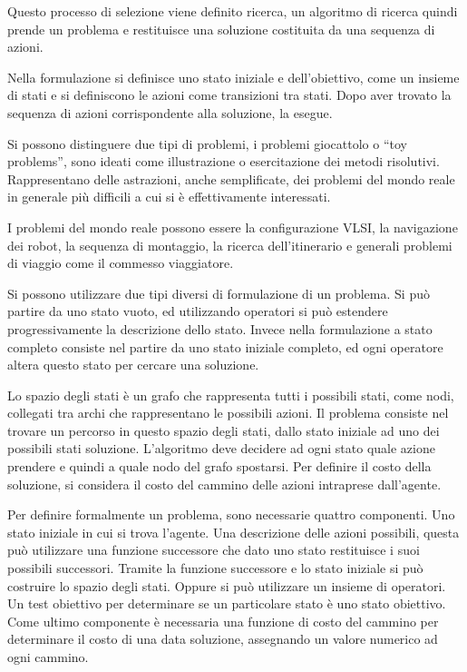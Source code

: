 \documentclass{article}
\numberwithin{equation}{subsection}
\begin{document}
Questo processo di selezione viene definito ricerca, un algoritmo di ricerca quindi  
prende un problema e restituisce una soluzione costituita da una sequenza di azioni. 

Nella formulazione si definisce uno stato iniziale e dell'obiettivo, come un insieme di stati 
e si definiscono le azioni come transizioni tra stati. Dopo aver trovato la sequenza di azioni 
corrispondente alla soluzione, la esegue. 


Si possono distinguere due tipi di problemi, i problemi giocattolo o ``toy problems'', sono 
ideati come illustrazione o esercitazione dei metodi risolutivi. Rappresentano delle 
astrazioni, anche semplificate, dei problemi del mondo reale in generale più difficili a cui 
si è effettivamente interessati. 

I problemi del mondo reale possono essere la configurazione VLSI, la navigazione dei robot, 
la sequenza di montaggio, la ricerca dell'itinerario e generali problemi di viaggio come il 
commesso viaggiatore. 



Si possono utilizzare due tipi diversi di formulazione di un problema. Si può partire da uno 
stato vuoto, ed utilizzando operatori si può estendere progressivamente la descrizione 
dello stato. 
Invece nella formulazione a stato completo consiste nel partire da uno stato iniziale completo, 
ed ogni operatore altera questo stato per cercare una soluzione. 


Lo spazio degli stati è un grafo che rappresenta tutti i possibili stati, come nodi, collegati 
tra archi che rappresentano le possibili azioni. Il problema consiste nel trovare un 
percorso in questo spazio degli stati, dallo stato iniziale ad uno dei possibili stati 
soluzione. L'algoritmo deve decidere ad ogni stato quale azione prendere e quindi a quale nodo 
del grafo spostarsi. 
Per definire il costo della soluzione, si considera il costo del cammino delle azioni 
intraprese dall'agente. 

Per definire formalmente un problema, sono necessarie quattro componenti. Uno stato iniziale 
in cui si trova l'agente. Una descrizione delle azioni possibili, questa può utilizzare una 
funzione successore che dato uno stato restituisce i suoi possibili successori. Tramite la 
funzione successore e lo stato iniziale si può costruire lo spazio degli stati. Oppure si 
può utilizzare un insieme di operatori. Un test obiettivo per determinare se un particolare 
stato è uno stato obiettivo. Come ultimo componente è necessaria una funzione di costo del 
cammino per determinare il costo di una data soluzione, assegnando un valore numerico ad 
ogni cammino. 
\end{document}
